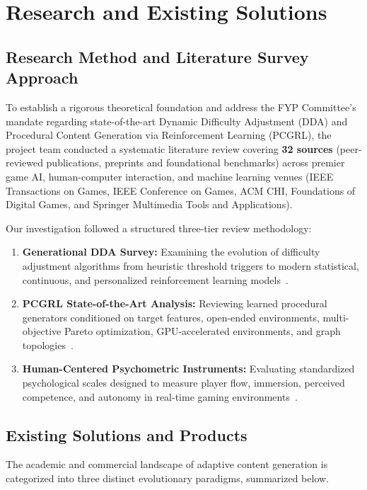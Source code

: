 \chapter{Research and Existing Solutions}
\label{chap:research}

\section{Research Method and Literature Survey Approach}
To establish a rigorous theoretical foundation and address the FYP Committee's mandate regarding state-of-the-art Dynamic Difficulty Adjustment (DDA) and Procedural Content Generation via Reinforcement Learning (PCGRL), the project team conducted a systematic literature review covering \textbf{32 sources} (peer-reviewed publications, preprints and foundational benchmarks) across premier game AI, human-computer interaction, and machine learning venues (IEEE Transactions on Games, IEEE Conference on Games, ACM CHI, Foundations of Digital Games, and Springer Multimedia Tools and Applications).

Our investigation followed a structured three-tier review methodology:
\begin{enumerate}
    \item \textbf{Generational DDA Survey:} Examining the evolution of difficulty adjustment algorithms from heuristic threshold triggers to modern statistical, continuous, and personalized reinforcement learning models~\cite{mortazavi2024dda, zohaib2018dynamic, fisher2024exploring, pfau2020enemy, fuchs2024personalized}.
    \item \textbf{PCGRL State-of-the-Art Analysis:} Reviewing learned procedural generators conditioned on target features, open-ended environments, multi-objective Pareto optimization, GPU-accelerated environments, and graph topologies~\cite{khalifa2020pcgrl, earle2021illuminating, earle2021controllable, yuan2026mopcgrl, li2025measuring, bazzaz2026imitation, earle2024pcgrlplus, rupp2024gpcgrl, yannakakis2018ai}.
    \item \textbf{Human-Centered Psychometric Instruments:} Evaluating standardized psychological scales designed to measure player flow, immersion, perceived competence, and autonomy in real-time gaming environments~\cite{denisova2016convergence, tyack2020sdt, michailidis2018flow}.
\end{enumerate}

\section{Existing Solutions and Products}
The academic and commercial landscape of adaptive content generation is categorized into three distinct evolutionary paradigms, summarized below.

